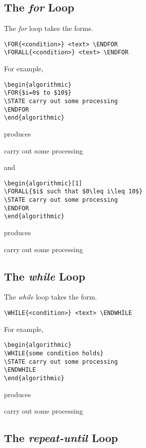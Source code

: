 \documentclass{article}
\begin{document}
\subsection{The \emph{for} Loop}

The \emph{for} loop takes the forms.
\begin{verbatim}
\FOR{<condition>} <text> \ENDFOR
\FORALL{<condition>} <text> \ENDFOR
\end{verbatim}
For example,
\begin{verbatim}
\begin{algorithmic}
\FOR{$i=0$ to $10$}
\STATE carry out some processing 
\ENDFOR
\end{algorithmic}
\end{verbatim}
produces
\begin{algorithmic}
  \STATE carry out some processing 
  \ENDFOR
\end{algorithmic}
and
\begin{verbatim}
\begin{algorithmic}[1]
\FORALL{$i$ such that $0\leq i\leq 10$}
\STATE carry out some processing 
\ENDFOR
\end{algorithmic}
\end{verbatim}
produces
\begin{algorithmic}[1]
  \STATE carry out some processing 
  \ENDFOR
\end{algorithmic}

\subsection{The \emph{while} Loop}

The \emph{while} loop takes the form.
\begin{verbatim}
\WHILE{<condition>} <text> \ENDWHILE
\end{verbatim}
For example,
\begin{verbatim}
\begin{algorithmic}
\WHILE{some condition holds}
\STATE carry out some processing 
\ENDWHILE
\end{algorithmic}
\end{verbatim}
produces
\begin{algorithmic}
  \STATE carry out some processing 
  \ENDWHILE
\end{algorithmic}

\subsection{The \emph{repeat-until} Loop}
\end{document}
